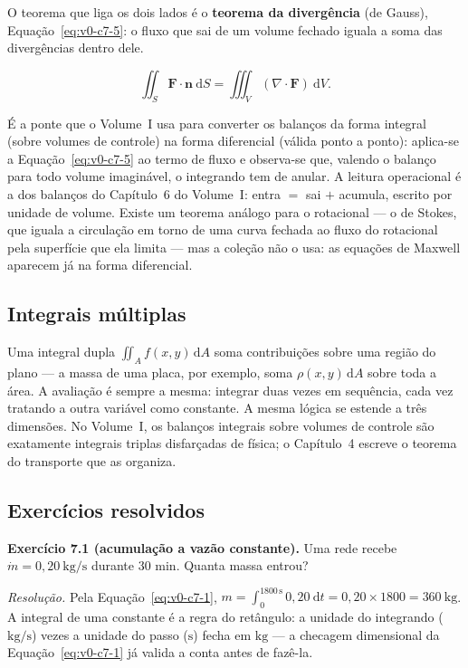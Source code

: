 \documentclass[12pt,a4paper]{article}
\numberwithin{equation}{section}
\numberwithin{table}{section}
\numberwithin{figure}{section}
\begin{document}
O teorema que liga os dois lados é o \textbf{teorema da divergência} (de
Gauss), Equação~\eqref{eq:v0-c7-5}: o fluxo que sai de um volume fechado
iguala a soma das divergências dentro dele.

\begin{equation}\label{eq:v0-c7-5}
\iint_S \bm{F}\cdot\bm{n}\ \mathrm{d}S
  = \iiint_V (\nabla\cdot\bm{F})\ \mathrm{d}V.
\end{equation}

É a ponte que o Volume~I usa para converter os balanços da forma integral
(sobre volumes de controle) na forma diferencial (válida ponto a ponto):
aplica-se a Equação~\eqref{eq:v0-c7-5} ao termo de fluxo e observa-se que,
valendo o balanço para todo volume imaginável, o integrando tem de anular.
A leitura operacional é a dos balanços do Capítulo~6 do Volume~I:
entra $=$ sai $+$ acumula, escrito por unidade de volume. Existe um
teorema análogo para o rotacional --- o de Stokes, que iguala a circulação
em torno de uma curva fechada ao fluxo do rotacional pela superfície que
ela limita --- mas a coleção não o usa: as equações de Maxwell aparecem já
na forma diferencial.

\subsection{Integrais múltiplas}

Uma integral dupla $\iint_A f(x,y)\,\mathrm{d}A$ soma contribuições sobre
uma região do plano --- a massa de uma placa, por exemplo, soma
$\rho(x,y)\,\mathrm{d}A$ sobre toda a área. A avaliação é sempre a mesma:
integrar duas vezes em sequência, cada vez tratando a outra variável como
constante. A mesma lógica se estende a três dimensões. No Volume~I, os
balanços integrais sobre volumes de controle são exatamente integrais
triplas disfarçadas de física; o Capítulo~4 escreve o teorema do
transporte que as organiza.

\subsection{Exercícios resolvidos}

\textbf{Exercício 7.1 (acumulação a vazão constante).} Uma rede recebe
$\dot{m} = 0{,}20\ \mathrm{kg/s}$ durante 30 min. Quanta massa entrou?

\emph{Resolução.} Pela Equação~\eqref{eq:v0-c7-1},
$m = \int_0^{1800\,\mathrm{s}} 0{,}20\ \mathrm{d}t = 0{,}20 \times 1800 =
360\ \mathrm{kg}$. A integral de uma constante é a regra do retângulo: a
unidade do integrando ($\mathrm{kg/s}$) vezes a unidade do passo
($\mathrm{s}$) fecha em $\mathrm{kg}$ --- a checagem dimensional da
Equação~\eqref{eq:v0-c7-1} já valida a conta antes de fazê-la.
\end{document}
